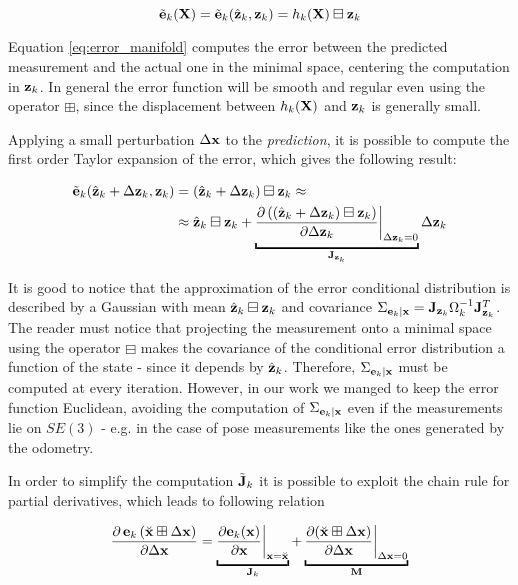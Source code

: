 \begin{equation}
    \tilde{\mathbf{e}}_k(\mathbf{X}) = \tilde{\mathbf{e}}_k(\hat{\mathbf{z}}_k, \mathbf{z}_k) = h_k(\mathbf{X}) \boxminus \mathbf{z}_k
    \label{eq:error_manifold}
\end{equation}

\noindent Equation \ref{eq:error_manifold} computes the error between the predicted measurement and the actual one in the minimal space, centering the computation in $\mathbf{z}_k$. In general the error function will be smooth and regular even using the operator $\boxplus$, since the displacement between $h_k(\mathbf{X})$ and $\mathbf{z}_k$ is generally small.

Applying a small perturbation $\Delta \mathbf{x}$ to the \textit{prediction}, it is possible to compute the first order Taylor expansion of the error, which gives the following result:

\begin{align}
    \terror_k(\pred_k + \dz_k, \meas_k) &= (\pred_k + \dz_k) \boxminus \meas_k \approx \nonumber \\
    &\approx \pred_k \boxminus \meas_k + \underbracket{\frac{\partial\left((\pred_k + \dz_k) \boxminus \meas_k\right)}{\partial\dz_k}  \bigg\rvert_{\dz_k = 0}}_{\jacob_{\meas_k}} \dz_k
    \label{eq:error_linearization}
\end{align}

\noindent It is good to notice that the approximation of the error conditional distribution is described by a Gaussian with mean $\hat{\mathbf{z}}_k \boxminus \mathbf{z}_k$ and covariance $\Sigma_{\mathbf{e}_k|\mathbf{x}} = \mathbf{J}_{\mathbf{z}_k}\Omega_k^{-1}\mathbf{J}_{\mathbf{z}_k}^T$. The reader must notice that projecting the measurement onto a minimal space using the operator $\boxminus$ makes the covariance of the conditional error distribution a function of the state - since it depends by $\hat{\mathbf{z}}_k$. Therefore, $\Sigma_{\mathbf{e}_k|\mathbf{x}}$ must be computed at every iteration. However, in our work we manged to keep the error function Euclidean, avoiding the computation of $\Sigma_{\mathbf{e}_k|\mathbf{x}}$ even if the measurements lie on $SE(3)$ - e.g. in the case of pose measurements like the ones generated by the odometry. 

In order to simplify the computation $\tilde{\mathbf{J}}_k$ it is possible to exploit the chain rule for partial derivatives, which leads to following relation

\begin{equation}
    \frac{\partial\, \error_k\left(\linstate \boxplus \dx\right)}{\partial \dx} = \underbracket{\frac{\partial \error_k(\state)}{\partial \state} \bigg\rvert_{\state = \linstate}}_{\jacob_k} + \underbracket{\frac{\partial (\linstate \boxplus \dx)}{\partial \dx} \bigg\rvert_{\dx = 0}}_{\mathbf{M}}
    \label{eq:jacobian_chain_rule}
\end{equation}

